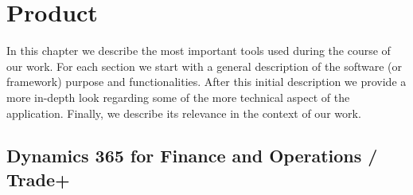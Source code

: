 \chapter{Product}

In this chapter we describe the most important tools used during the course of our work. For each section we start with a general description of the software (or framework) purpose and functionalities. After this initial description we provide a more in-depth look regarding some of the more technical aspect of the application. Finally, we describe its relevance in the context of our work.

\section{Dynamics 365 for Finance and Operations / Trade+} 

